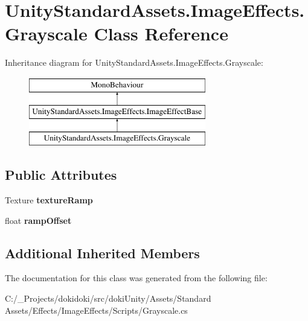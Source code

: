 \hypertarget{class_unity_standard_assets_1_1_image_effects_1_1_grayscale}{}\section{Unity\+Standard\+Assets.\+Image\+Effects.\+Grayscale Class Reference}
\label{class_unity_standard_assets_1_1_image_effects_1_1_grayscale}
Inheritance diagram for Unity\+Standard\+Assets.\+Image\+Effects.\+Grayscale\+:\begin{figure}[H]
\begin{center}
\leavevmode
\includegraphics[height=3.000000cm]{class_unity_standard_assets_1_1_image_effects_1_1_grayscale}
\end{center}
\end{figure}
\subsection*{Public Attributes}
\begin{DoxyCompactItemize}
\item 
Texture {\bfseries texture\+Ramp}\hypertarget{class_unity_standard_assets_1_1_image_effects_1_1_grayscale_a0eb120d0884c76cd7c0a7e2c0d455c37}{}\label{class_unity_standard_assets_1_1_image_effects_1_1_grayscale_a0eb120d0884c76cd7c0a7e2c0d455c37}

\item 
float {\bfseries ramp\+Offset}\hypertarget{class_unity_standard_assets_1_1_image_effects_1_1_grayscale_a313d99a0ce13e7f58f5694f83d8cae0e}{}\label{class_unity_standard_assets_1_1_image_effects_1_1_grayscale_a313d99a0ce13e7f58f5694f83d8cae0e}

\end{DoxyCompactItemize}
\subsection*{Additional Inherited Members}


The documentation for this class was generated from the following file\+:\begin{DoxyCompactItemize}
\item 
C\+:/\+\_\+\+Projects/dokidoki/src/doki\+Unity/\+Assets/\+Standard Assets/\+Effects/\+Image\+Effects/\+Scripts/Grayscale.\+cs\end{DoxyCompactItemize}
